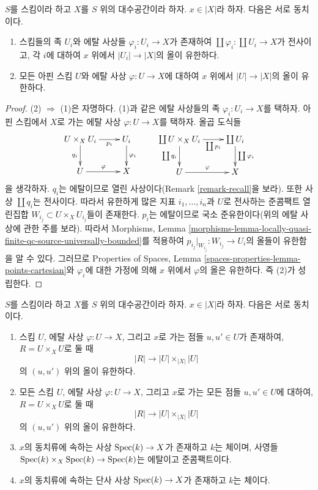 \begin{lemma}
\label{lemma-U-finite-above-x}
$S$를 스킴이라 하고 $X$를 $S$ 위의 대수공간이라 하자.
$x \in |X|$라 하자. 다음은 서로 동치이다.
\begin{enumerate}
\item 스킴들의 족 $U_i$와 에탈 사상들 $\varphi_i : U_i \to X$가 존재하여
$\coprod \varphi_i : \coprod U_i \to X$가 전사이고, 각 $i$에 대하여
$x$ 위에서 $|U_i| \to |X|$의 올이 유한하다.
\item 모든 아핀 스킴 $U$와 에탈 사상 $\varphi : U \to X$에 대하여
$x$ 위에서 $|U| \to |X|$의 올이 유한하다.
\end{enumerate}
\end{lemma}

\begin{proof}
(2) $\Rightarrow$ (1)은 자명하다. (1)과 같은 에탈 사상들의 족
$\varphi_i : U_i \to X$를 택하자. 아핀 스킴에서 $X$로 가는 에탈 사상
$\varphi : U \to X$를 택하자. 올곱 도식들
$$
\xymatrix{
U \times_X U_i \ar[r]_-{p_i} \ar[d]_{q_i} & U_i \ar[d]^{\varphi_i} \\
U \ar[r]^\varphi & X
}
\quad \quad
\xymatrix{
\coprod U \times_X U_i \ar[r]_-{\coprod p_i} \ar[d]_{\coprod q_i} &
\coprod U_i \ar[d]^{\coprod \varphi_i} \\
U \ar[r]^\varphi & X
}
$$
을 생각하자. $q_i$는 에탈이므로 열린 사상이다(Remark
\ref{remark-recall}을 보라). 또한 사상 $\coprod q_i$는 전사이다.
따라서 유한하게 많은 지표 $i_1, \ldots, i_n$과 $U$로 전사하는
준콤팩트 열린집합 $W_{i_j} \subset U \times_X U_{i_j}$들이 존재한다.
$p_i$는 에탈이므로 국소 준유한이다(위의 에탈 사상에 관한 주를 보라).
따라서 Morphisms, Lemma
\ref{morphisms-lemma-locally-quasi-finite-qc-source-universally-bounded}를
적용하여
$p_{i_j}|_{W_{i_j}} : W_{i_j} \to U_i$의 올들이 유한함을 알 수 있다.
그러므로 Properties of Spaces, Lemma
\ref{spaces-properties-lemma-points-cartesian}와 $\varphi_i$에 대한 가정에
의해 $x$ 위에서 $\varphi$의 올은 유한하다. 즉 (2)가 성립한다.
\end{proof}

\begin{lemma}
\label{lemma-R-finite-above-x}
$S$를 스킴이라 하고 $X$를 $S$ 위의 대수공간이라 하자.
$x \in |X|$라 하자. 다음은 서로 동치이다.
\begin{enumerate}
\item 스킴 $U$, 에탈 사상 $\varphi : U \to X$, 그리고 $x$로 가는 점들
$u, u' \in U$가 존재하여, $R = U \times_X U$로 둘 때
$$
|R| \to |U| \times_{|X|} |U|
$$
의 $(u, u')$ 위의 올이 유한하다.
\item 모든 스킴 $U$, 에탈 사상 $\varphi : U \to X$, 그리고 $x$로 가는
모든 점들 $u, u' \in U$에 대하여, $R = U \times_X U$로 둘 때
$$
|R| \to |U| \times_{|X|} |U|
$$
의 $(u, u')$ 위의 올이 유한하다.
\item $x$의 동치류에 속하는 사상 $\mathop{\mathrm{Spec}}(k) \to X$가 존재하고 $k$는
체이며, 사영들 $\mathop{\mathrm{Spec}}(k) \times_X \mathop{\mathrm{Spec}}(k) \to \mathop{\mathrm{Spec}}(k)$는 에탈이고
준콤팩트이다.
\item $x$의 동치류에 속하는 단사 사상 $\mathop{\mathrm{Spec}}(k) \to X$가 존재하고
$k$는 체이다.
\end{enumerate}
\end{lemma}

